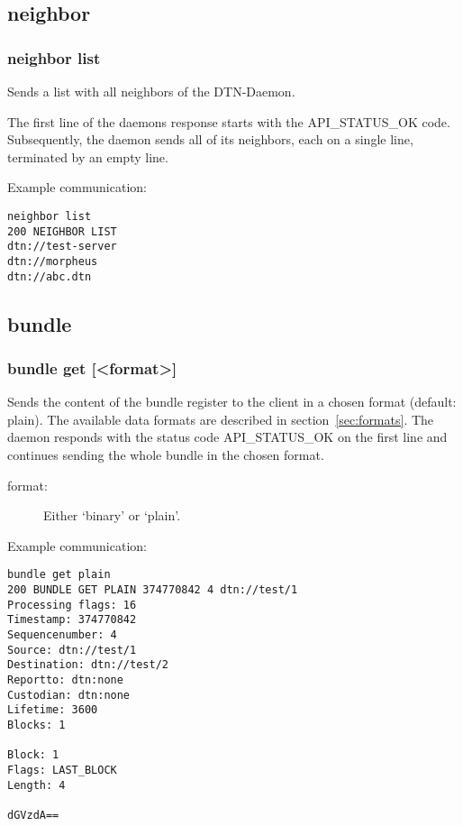 \documentclass[12pt, a4paper]{scrartcl}
\begin{document}
\subsection{neighbor}
\subsubsection*{neighbor list}
Sends a list with all neighbors of the DTN-Daemon.

The first line of the daemons response starts with the API\_STATUS\_OK code.
Subsequently, the daemon sends all of its neighbors, each on a single line, terminated by an empty line.

Example communication:\\
\makebox[\textwidth]{\hrulefill}
\begin{verbatim}
neighbor list
200 NEIGHBOR LIST
dtn://test-server
dtn://morpheus
dtn://abc.dtn

\end{verbatim}
\makebox[\textwidth]{\hrulefill}
\subsection{bundle}
\subsubsection*{bundle get [<format>]}
Sends the content of the bundle register to the client in a chosen format (default: plain).
The available data formats are described in section~\ref{sec:formats}.
The daemon responds with the status code API\_STATUS\_OK on the first line and continues sending the whole bundle in the chosen format.
\begin{description}
\item[format:] Either `binary' or `plain'.
\end{description}
Example communication:\\
\makebox[\textwidth]{\hrulefill}
\begin{verbatim}
bundle get plain
200 BUNDLE GET PLAIN 374770842 4 dtn://test/1
Processing flags: 16
Timestamp: 374770842
Sequencenumber: 4
Source: dtn://test/1
Destination: dtn://test/2
Reportto: dtn:none
Custodian: dtn:none
Lifetime: 3600
Blocks: 1

Block: 1
Flags: LAST_BLOCK
Length: 4

dGVzdA==

\end{verbatim}
\makebox[\textwidth]{\hrulefill}
\end{document}
